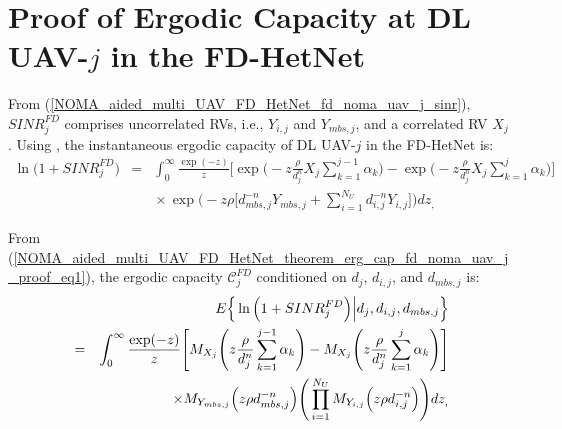 \section{Proof of Ergodic Capacity at DL UAV-$j$ in the FD-HetNet} \label{NOMA_aided_multi_UAV_FD_HetNet_theorem_erg_cap_fd_noma_DL_uav_j_proof}

From (\ref{NOMA_aided_multi_UAV_FD_HetNet_fd_noma_uav_j_sinr}), $SINR_{j}^{FD}$ comprises uncorrelated RVs, i.e., $Y_{i,j}$ and $Y_{mbs,j}$, and a correlated RV $X_j$. Using \cite[eq. (5)]{hamdi2010useful}, the instantaneous ergodic capacity of DL UAV-$j$ in the FD-HetNet is:
\begin{eqnarray} \label{NOMA_aided_multi_UAV_FD_HetNet_theorem_erg_cap_fd_noma_uav_j_proof_eq1}
\ln\Big(1+SINR_{j}^{FD}\Big) & = & \int_{0}^{\infty} \frac{\exp(-z)}{z} \Bigg[\exp\Bigg(-z \frac{\rho }{d_j^{n}} X_j \sum_{k=1}^{j-1}\alpha_k \Bigg) - \exp\Bigg(-z \frac{\rho }{d_j^{n}} X_j \sum_{k=1}^{j}\alpha_k \Bigg) \Bigg] \nonumber \\
 & & \hspace{0cm} \times \exp\Bigg(-z \rho  \Bigg[ d_{mbs,j}^{-n} Y_{mbs,j} + \sum_{i=1}^{N_U} d_{i,j}^{-n} Y_{i,j} \Bigg]\Bigg) dz_,
\end{eqnarray}

From (\ref{NOMA_aided_multi_UAV_FD_HetNet_theorem_erg_cap_fd_noma_uav_j_proof_eq1}), the ergodic capacity $\mathcal{C}_{j}^{FD}$ conditioned on $d_j$, $d_{i,j}$, and $d_{mbs,j}$ is:
\begin{eqnarray} \label{NOMA_aided_multi_UAV_FD_HetNet_theorem_erg_cap_fd_noma_uav_j_proof_eq2}
& & \hspace{-3cm} E\Big\{\ln\Big(1+SINR_{j}^{FD}\Big)\Big|d_j, d_{i,j}, d_{mbs,j} \Big\} \nonumber \\
 & = & \int_{0}^{\infty} \frac{\exp(-z)}{z} \Bigg[M_{X_j}\Bigg(z \frac{\rho }{d_j^{n}} \sum_{k=1}^{j-1}\alpha_k \Bigg) - M_{X_j}\Bigg(z \frac{\rho }{d_j^{n}} \sum_{k=1}^{j}\alpha_k\Bigg)\Bigg]  \nonumber \\
 & & \hspace{0cm} \times  M_{Y_{mbs,j}}\Big(z \rho  d_{mbs,j}^{-n} \Big) \Bigg( \prod_{i=1}^{N_U} M_{Y_{i,j}}\Big(z \rho  d_{i,j}^{-n}\Big) \Bigg) dz_,
\end{eqnarray}

